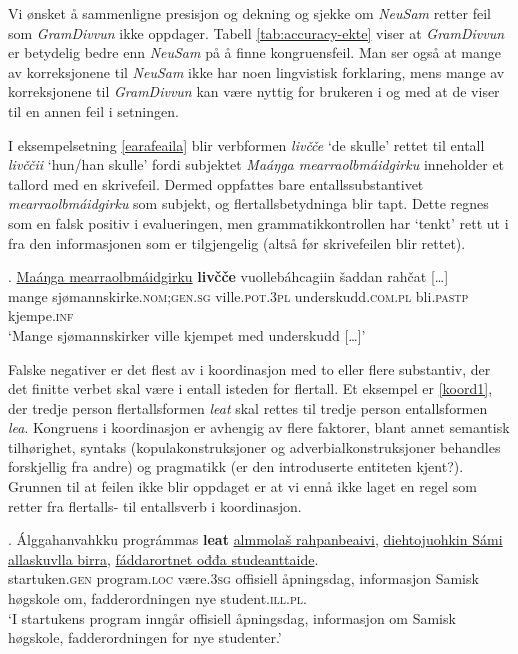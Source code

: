 \documentclass{flammie}
\begin{document}
Vi ønsket å sammenligne presisjon og dekning og sjekke om \textit{NeuSam} retter
feil som \textit{GramDivvun} ikke oppdager.  Tabell \ref{tab:accuracy-ekte}
viser at \textit{GramDivvun} er betydelig bedre enn \textit{NeuSam} på å finne
kongruensfeil. Man ser også at mange av korreksjonene til \textit{NeuSam} ikke
har noen lingvistisk forklaring, mens mange av korreksjonene til
\textit{GramDivvun} kan være nyttig for brukeren i og med at de viser til en
annen feil i setningen.

I eksempelsetning \ref{earafeaila} blir verbformen \textit{livčče} `de skulle'
rettet til entall \textit{livččii} `hun/han skulle' fordi subjektet
\textit{Maáŋga mearraolbmáidgirku} inneholder et tallord med en skrivefeil.
Dermed oppfattes bare entallssubstantivet \textit{mearraolbmáidgirku} som
subjekt, og flertallsbetydninga blir tapt.  Dette regnes som en falsk positiv i
evalueringen, men grammatikkontrollen har `tenkt' rett ut i fra den
informasjonen som er tilgjengelig (altså før skrivefeilen blir rettet).

\exg. \underline{Maáŋga mearraolbmáidgirku} \textbf{livčče} vuollebáhcagiin šaddan rahčat [\ldots]\label{earafeaila}\\
{mange sjømannskirke\textsc{.nom;gen.sg}} ville\textsc{.pot.3pl} underskudd\textsc{.com.pl} bli\textsc{.pastp} kjempe\textsc{.inf}\\
`Mange sjømannskirker ville kjempet med underskudd [\ldots]'


Falske negativer er det flest av i koordinasjon med to eller flere substantiv,
der det finitte verbet skal være i entall isteden for flertall. Et eksempel er
\ref{koord1}, der tredje person flertallsformen \textit{leat} skal rettes til
tredje person entallsformen \textit{lea}. Kongruens i koordinasjon er avhengig
av flere faktorer, blant annet semantisk tilhørighet, syntaks
(kopulakonstruksjoner og adverbialkonstruksjoner behandles forskjellig fra
andre) og pragmatikk (er den introduserte entiteten kjent?).  Grunnen til at
feilen ikke blir oppdaget er at vi ennå ikke laget en regel som retter fra
flertalls- til entallsverb i koordinasjon.

\exg. Álggahanvahkku prográmmas \textbf{leat} \underline{almmolaš rahpanbeaivi}, \underline{diehtojuohkin Sámi allaskuvlla birra}, \underline{fáddarortnet ođđa studeanttaide}.\label{koord1}\\
startuken\textsc{.gen} program\textsc{.loc} være\textsc{.3sg} {offisiell åpningsdag}, {informasjon Samisk høgskole om}, {fadderordningen nye student\textsc{.ill.pl}}.\\
`I startukens program inngår offisiell åpningsdag, informasjon om Samisk høgskole, fadderordningen for nye studenter.'
\end{document}
